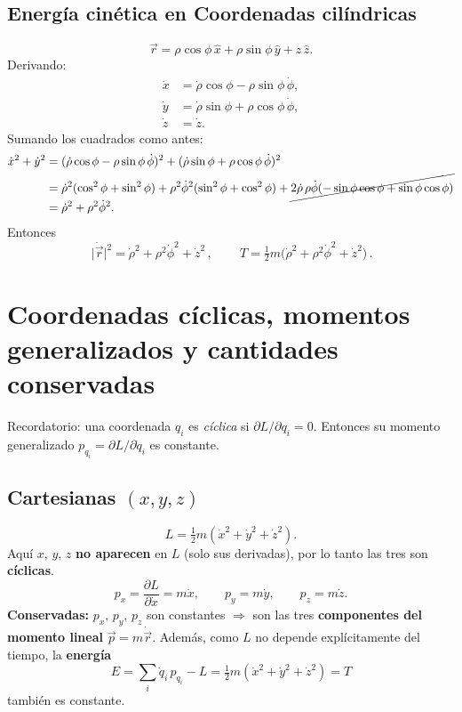 \documentclass{article}
\begin{document}
\subsection*{ Energía cinética en Coordenadas cilíndricas }
\[
\vec r=\rho\cos\phi\,\hat{x}+\rho\sin\phi\,\hat{y}+z\,\hat{z}.
\]
\noindent Derivando:
\[
\begin{aligned}
\dot x&=\dot\rho\cos\phi-\rho\sin\phi\,\dot\phi,\\
\dot y&=\dot\rho\sin\phi+\rho\cos\phi\,\dot\phi,\\
\dot z&=\dot z.
\end{aligned}
\]
\noindent Sumando los cuadrados como antes:
\[
\begin{aligned}
\dot x^2+\dot y^2
&=(\dot\rho\cos\phi-\rho\sin\phi\,\dot\phi)^2
+(\dot\rho\sin\phi+\rho\cos\phi\,\dot\phi)^2\\
&=\dot\rho^2(\cos^2\phi+\sin^2\phi)
+\rho^2\dot\phi^2(\sin^2\phi+\cos^2\phi)
+\cancel{2\dot\rho\,\rho\dot\phi(-\sin\phi\cos\phi+\sin\phi\cos\phi)}\\
&=\dot\rho^2+\rho^2\dot\phi^2.
\end{aligned}
\]
Entonces
\[
\boxed{\,\lvert\dot{\vec r}\rvert^2=\dot\rho^2+\rho^2\dot\phi^2+\dot z^2\,},
\qquad
\boxed{\,T=\tfrac12 m\big(\dot\rho^2+\rho^2\dot\phi^2+\dot z^2\big)\,}.
\]
\section*{Coordenadas cíclicas, momentos generalizados y cantidades conservadas}

Recordatorio: una coordenada \(q_i\) es \emph{cíclica} si \( \partial L/\partial q_i = 0 \).
Entonces su momento generalizado \(p_{q_i}=\partial L/\partial \dot q_i\) es constante.

\subsection*{Cartesianas \((x,y,z)\)}
\[
L=\tfrac12 m(\dot x^2+\dot y^2+\dot z^2).
\]
Aquí \(x,\,y,\,z\) \textbf{no aparecen} en \(L\) (solo sus derivadas), por lo tanto las tres son \textbf{cíclicas}.
\[
p_x=\frac{\partial L}{\partial \dot x}=m\dot x,\qquad
p_y=m\dot y,\qquad
p_z=m\dot z.
\]
\textbf{Conservadas:} \(p_x,\,p_y,\,p_z\) son constantes \(\Rightarrow\) son las tres
\textbf{componentes del momento lineal} \(\vec p=m\dot{\vec r}\).
Además, como \(L\) no depende explícitamente del tiempo, la \textbf{energía}
\[
E= \sum_i \dot q_i\,p_{q_i}-L=\tfrac12 m(\dot x^2+\dot y^2+\dot z^2)=T
\]
también es constante.
\end{document}

